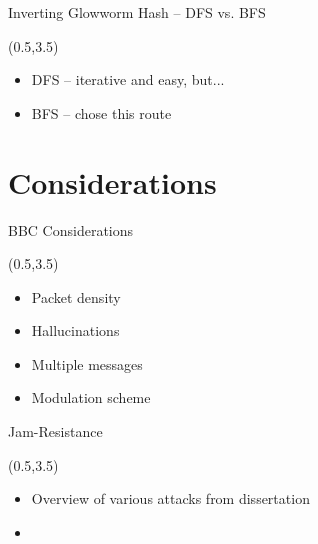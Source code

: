 \documentclass[xcolor=x11names,compress,handout]{beamer}
\begin{document}

\begin{frame}{Inverting Glowworm Hash -- DFS vs. BFS}

	\begin{textblock}{14.5}(0.5,3.5)
		\begin{itemize}
			\item DFS -- iterative and easy, but...
			\item BFS -- chose this route
		\end{itemize}
	\end{textblock}
\end{frame}

\section{Considerations}
\begin{frame}{BBC Considerations}

	\begin{textblock}{14.5}(0.5,3.5)
		\begin{itemize}
			\item Packet density
			\item Hallucinations
			\item Multiple messages
			\item Modulation scheme
		\end{itemize}
	\end{textblock}
\end{frame}


\begin{frame}{Jam-Resistance}

	\begin{textblock}{14.5}(0.5,3.5)
		\begin{itemize}
			\item Overview of various attacks from dissertation
			\item 
		\end{itemize}
	\end{textblock}
\end{frame}

\end{document}
